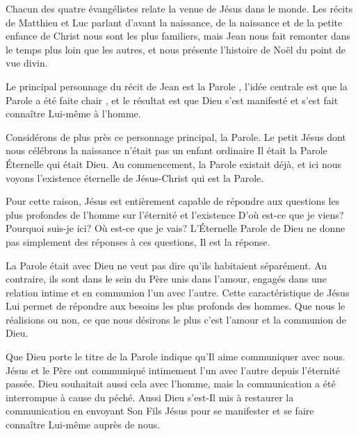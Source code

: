 

Chacun des quatre évangélistes relate la venue de Jésus dans le monde. Les récits de Matthieu et Luc parlant d'avant la naissance, de la naissance et de la petite enfance de Christ nous sont les plus familiers, mais Jean nous fait remonter dans le temps plus loin que les autres, et nous présente l'histoire de Noël du point de vue divin.

Le principal personnage du récit de Jean est \Og la Parole \Fg{}, l'idée centrale est que \Og la Parole a été faite chair \Fg{}, et le résultat est que Dieu s'est manifesté et s'est fait connaître Lui-même à l'homme.

Considérons de plus près ce personnage principal, la Parole. Le petit Jésus dont nous célébrons la naissance n'était pas un enfant ordinaire \ocadr Il était la Parole Éternelle qui était Dieu. Au commencement, la Parole existait déjà, et ici nous voyons l'existence éternelle de Jésus-Christ qui est la Parole.

Pour cette raison, Jésus est entièrement capable de répondre aux questions les plus profondes de l'homme sur l'éternité et l'existence\frcolon{} D'où est-ce que je viens? Pourquoi suis-je ici? Où est-ce que je vais? L'Éternelle Parole de Dieu ne donne pas simplement des réponses à ces questions, Il est la réponse.

\Og La Parole était avec Dieu \Fg{} ne veut pas dire qu'ils habitaient séparément. Au contraire, ils sont dans le sein du Père \ocadr unis dans l'amour, engagés dans une relation intime et en communion l'un avec l'autre. Cette caractéristique de Jésus Lui permet de répondre aux besoins les plus profonds des hommes. Que nous le réalisions ou non, ce que nous désirons le plus c'est l'amour et la communion de Dieu.

Que Dieu porte le titre de \Og la Parole \Fg{} indique qu'Il aime communiquer avec nous. Jésus et le Père ont communiqué intimement l'un avec l'autre depuis l'éternité passée. Dieu souhaitait aussi cela avec l'homme, mais la communication a été interrompue à cause du péché. Aussi Dieu s'est-Il mis à restaurer la communication en envoyant Son Fils Jésus pour se manifester et se faire connaître Lui-même auprès de nous.

